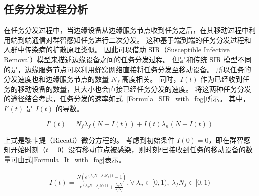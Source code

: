 \subsection{任务分发过程分析}


在任务分发过程中，当边缘设备从边缘服务节点收到任务之后，在其移动过程中利用端到端通信对群智感知任务进行二次分发。
这种基于端到端的任务分发过程和人群中传染病的扩散原理类似。
因此可以借助 SIR（Susceptible Infective Removal）模型来描述边缘设备之间的任务分发过程。
但是和传统 SIR 模型不同的是，边缘服务节点可以利用蜂窝网络直接将任务分发至移动设备。
所以任务的分发速度也和边缘服务节点的数量 $N_f$ 高度相关。
同时，$I(t)$ 作为已经收到任务的移动设备的数量，其大小也会直接已经任务分发的速度。
将这两种任务分发的途径结合考虑，任务分发的速率如式~\eqref{Formula_SIR_with_fog}所示。
其中，$I'(t)$ 是 $I(t)$ 的导数。

\begin{equation}
  \label{Formula_SIR_with_fog}
  I'(t) = N_f \lambda_f (N-I(t)) + I(t) \lambda_n (N-I(t))
\end{equation}

上式是黎卡提（Riccati）微分方程的。
考虑到初始条件 $I(0)=0$，即在群智感知开始时刻（$t=0$）没有移动节点被感染，则时刻$t$已接收到任务的移动设备的数量可由式\eqref{Formula_It_with_fog}表示。

\begin{equation}
\label{Formula_It_with_fog}
\begin{aligned}
I(t) = \frac{N (e^{(\lambda_n N + \lambda_f N_f) t} - 1)}{e^{(\lambda_n N + \lambda_f N_f) t} + \frac{\lambda_n N}{\lambda_f N_f}}, \forall\ \lambda_n \in [0, 1),\ \lambda_f N_f \in [0, 1)
\end{aligned}
\end{equation}

